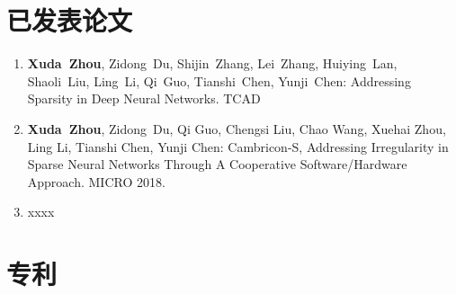﻿\begin{publications}

\section*{已发表论文}
\begin{enumerate}
\item 
\textbf{Xuda~Zhou}, Zidong~Du, Shijin~Zhang, Lei~Zhang, Huiying~Lan, Shaoli~Liu, Ling~Li, Qi~Guo, Tianshi~Chen, Yunji~Chen: Addressing Sparsity in Deep Neural Networks. TCAD
\item
\textbf{Xuda~Zhou}, Zidong~Du, Qi Guo, Chengsi Liu, Chao Wang, Xuehai Zhou, Ling Li, Tianshi Chen, Yunji Chen: Cambricon-S, Addressing Irregularity in Sparse Neural Networks Through A Cooperative Software/Hardware Approach. MICRO 2018.
\item
xxxx
\end{enumerate}


\section*{专利}

\end{publications}
